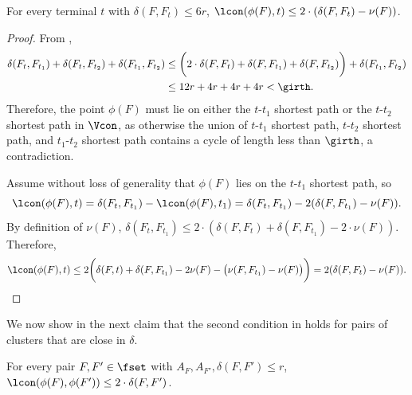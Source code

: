     \begin{claim} \label{clm:g-proj}
        For every terminal $t$ with $\delta(F,F_t) \le 6r$, $\lcon(\phi(F),t) \le 2\cdot (\delta(F,F_t) - \nu(F))$.
    \end{claim} 

    \begin{proof}
From , 
\[
\begin{split}
\delta(F_t,F_{t_1}) + \delta(F_t,F_{t_2}) + \delta(F_{t_1},F_{t_2}) & \le  \bigg(2\cdot \delta(F,F_t) + \delta(F,F_{t_1}) + \delta(F,F_{t_2})\bigg) + \delta(F_{t_1},F_{t_2}) \\ 
& \le  12 r + 4 r + 4 r + 4 r < \girth.
\end{split}
\] 
Therefore, the point $\phi(F)$ must lie on either the $t$-${t_1}$ shortest path or the $t$-${t_2}$ shortest path in $\Vcon$, as otherwise the union of $t$-${t_1}$ shortest path, $t$-${t_2}$ shortest path, and $t_1$-${t_2}$ shortest path contains a cycle of length less than $\girth$, a contradiction.  

Assume without loss of generality that $\phi(F)$ lies on the $t$-${t_1}$ shortest path, so 
$$\lcon(\phi(F),t) = \delta(F_t,F_{t_1}) - \lcon (\phi(F),{t_1}) = \delta(F_t,F_{t_1}) - 2(\delta(F,F_{t_1}) - \nu(F)).$$ By definition of $\nu(F)$, $\delta(F_t,F_{t_1}) \le 2\cdot (\delta(F,F_t)+\delta(F,F_{t_1}) - 2\cdot\nu(F))$. Therefore, $$\lcon(\phi(F),t) \le 2\bigg(\delta(F,t)+\delta(F,F_{t_1}) - 2\nu(F) - \big(\nu(F,F_{t_1}) -\nu(F)\big)\bigg) = 2(\delta(F,F_t)-\nu(F)).$$
    \end{proof}


We now show in the next claim that the second condition in  holds for pairs of clusters that are close in $\delta$.

\begin{claim} \label{clm:g-close}
For every pair $F,F'\in \fset$ with $A_{F}, A_{F'},\delta(F,F') \le r$,  $\lcon(\phi(F),\phi(F')) \le 2\cdot\delta(F,F')$. 
    \end{claim}

